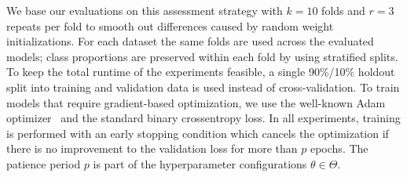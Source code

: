 We base our evaluations on this assessment strategy with $k = 10$ folds and $r = 3$ repeats per fold to smooth out differences caused by random weight initializations.
For each dataset the same folds are used across the evaluated models; class proportions are preserved within each fold by using stratified splits.
To keep the total runtime of the experiments feasible, a single 90\%/10\% holdout split into training and validation data is used instead of cross-validation.
To train models that require gradient-based optimization, we use the well-known Adam optimizer~\cite{Kingma2015} and the standard binary crossentropy loss.
In all experiments, training is performed with an early stopping condition which cancels the optimization if there is no improvement to the validation loss for more than $p$ epochs.
The patience period $p$ is part of the hyperparameter configurations $\theta \in \Theta$.

